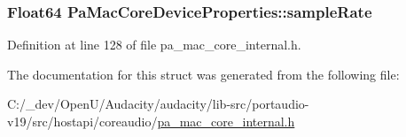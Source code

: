 \subsubsection[{\texorpdfstring{sample\+Rate}{sampleRate}}]{\setlength{\rightskip}{0pt plus 5cm}Float64 Pa\+Mac\+Core\+Device\+Properties\+::sample\+Rate}\hypertarget{struct_pa_mac_core_device_properties_a0da4b19e2993717c1e09ab86a6930ee4}{}\label{struct_pa_mac_core_device_properties_a0da4b19e2993717c1e09ab86a6930ee4}


Definition at line 128 of file pa\+\_\+mac\+\_\+core\+\_\+internal.\+h.



The documentation for this struct was generated from the following file\+:\begin{DoxyCompactItemize}
\item 
C\+:/\+\_\+dev/\+Open\+U/\+Audacity/audacity/lib-\/src/portaudio-\/v19/src/hostapi/coreaudio/\hyperlink{pa__mac__core__internal_8h}{pa\+\_\+mac\+\_\+core\+\_\+internal.\+h}\end{DoxyCompactItemize}

